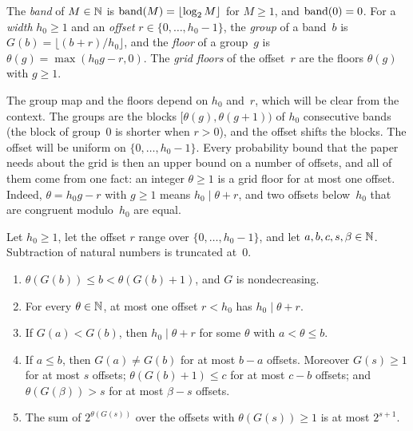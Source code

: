 \begin{definition}\label{def:grid}
The \emph{band} of $M\in\mathbb{N}$ is $\operatorname{band}(M)=\lfloor\log_2M\rfloor$ for $M\ge1$, and $\operatorname{band}(0)=0$. For a \emph{width} $h_0\ge1$
and an \emph{offset} $r\in\{0,\dots,h_0-1\}$, the \emph{group} of a band~$b$ is $G(b)=\lfloor(b+r)/h_0\rfloor$, and the
\emph{floor} of a group~$g$ is $\theta(g)=\max(h_0g-r,0)$. The \emph{grid floors} of the offset~$r$ are the floors $\theta(g)$
with $g\ge1$.
\end{definition}

The group map and the floors depend on $h_0$ and~$r$, which will be clear from the context. The groups are the blocks
$[\theta(g),\theta(g+1))$ of $h_0$ consecutive bands (the block of group~$0$ is shorter when $r>0$), and the offset shifts
the blocks. The offset will be uniform on $\{0,\dots,h_0-1\}$. Every probability bound that the paper needs about the grid
is then an upper bound on a number of offsets, and all of them come from one fact: an integer $\theta\ge1$ is a grid floor
for at most one offset. Indeed, $\theta=h_0g-r$ with $g\ge1$ means $h_0\mid\theta+r$, and two offsets below~$h_0$ that are
congruent modulo~$h_0$ are equal.

\begin{lemma}\label{lem:grid}
Let $h_0\ge1$, let the offset $r$ range over $\{0,\dots,h_0-1\}$, and let $a,b,c,s,\beta\in\mathbb{N}$. Subtraction of natural numbers
is truncated at~$0$.
\begin{enumerate}[label=(\alph*)]
\item $\theta(G(b))\le b<\theta(G(b)+1)$, and $G$ is nondecreasing.
\item For every $\theta\in\mathbb{N}$, at most one offset $r<h_0$ has $h_0\mid\theta+r$.
\item If $G(a)<G(b)$, then $h_0\mid\theta+r$ for some $\theta$ with $a<\theta\le b$.
\item If $a\le b$, then $G(a)\ne G(b)$ for at most $b-a$ offsets. Moreover $G(s)\ge1$ for at most $s$ offsets;
$\theta(G(b)+1)\le c$ for at most $c-b$ offsets; and $\theta(G(\beta))>s$ for at most $\beta-s$ offsets.
\item The sum of $2^{\theta(G(s))}$ over the offsets with $\theta(G(s))\ge1$ is at most $2^{s+1}$.
\end{enumerate}
\end{lemma}

